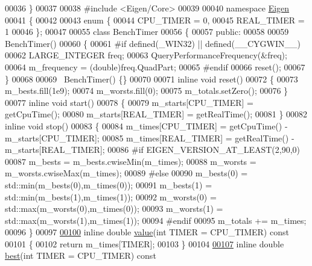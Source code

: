 \begin{DoxyCode}
00036 \}
00037 
00038 \textcolor{preprocessor}{#include <Eigen/Core>}
00039 
00040 \textcolor{keyword}{namespace }\hyperlink{namespace_eigen}{Eigen}
00041 \{
00042 
00043 \textcolor{keyword}{enum} \{
00044   CPU\_TIMER = 0,
00045   REAL\_TIMER = 1
00046 \};
00047 
00055 \textcolor{keyword}{class }BenchTimer
00056 \{
00057 \textcolor{keyword}{public}:
00058 
00059   BenchTimer()
00060   \{
00061 \textcolor{preprocessor}{#if defined(\_WIN32) || defined(\_\_CYGWIN\_\_)}
00062     LARGE\_INTEGER freq;
00063     QueryPerformanceFrequency(&freq);
00064     m\_frequency = (double)freq.QuadPart;
00065 #endif
00066     reset();
00067   \}
00068 
00069   ~BenchTimer() \{\}
00070 
00071   \textcolor{keyword}{inline} \textcolor{keywordtype}{void} reset()
00072   \{
00073     m\_bests.fill(1e9);
00074     m\_worsts.fill(0);
00075     m\_totals.setZero();
00076   \}
00077   \textcolor{keyword}{inline} \textcolor{keywordtype}{void} start()
00078   \{
00079     m\_starts[CPU\_TIMER]  = getCpuTime();
00080     m\_starts[REAL\_TIMER] = getRealTime();
00081   \}
00082   \textcolor{keyword}{inline} \textcolor{keywordtype}{void} stop()
00083   \{
00084     m\_times[CPU\_TIMER] = getCpuTime() - m\_starts[CPU\_TIMER];
00085     m\_times[REAL\_TIMER] = getRealTime() - m\_starts[REAL\_TIMER];
00086 \textcolor{preprocessor}{    #if EIGEN\_VERSION\_AT\_LEAST(2,90,0)}
00087     m\_bests = m\_bests.cwiseMin(m\_times);
00088     m\_worsts = m\_worsts.cwiseMax(m\_times);
00089 \textcolor{preprocessor}{    #else}
00090     m\_bests(0) = std::min(m\_bests(0),m\_times(0));
00091     m\_bests(1) = std::min(m\_bests(1),m\_times(1));
00092     m\_worsts(0) = std::max(m\_worsts(0),m\_times(0));
00093     m\_worsts(1) = std::max(m\_worsts(1),m\_times(1));
00094 \textcolor{preprocessor}{    #endif}
00095     m\_totals += m\_times;
00096   \}
00097 
\hyperlink{class_eigen_1_1_bench_timer_a26760f963ed8b64c126159bfea57735e}{00100}   \textcolor{keyword}{inline} \textcolor{keywordtype}{double} \hyperlink{class_eigen_1_1_bench_timer_a26760f963ed8b64c126159bfea57735e}{value}(\textcolor{keywordtype}{int} TIMER = CPU\_TIMER)\textcolor{keyword}{ const}
00101 \textcolor{keyword}{  }\{
00102     \textcolor{keywordflow}{return} m\_times[TIMER];
00103   \}
00104 
\hyperlink{class_eigen_1_1_bench_timer_ae8b673b0fa356d3432c7a65c79e8af0e}{00107}   \textcolor{keyword}{inline} \textcolor{keywordtype}{double} \hyperlink{class_eigen_1_1_bench_timer_ae8b673b0fa356d3432c7a65c79e8af0e}{best}(\textcolor{keywordtype}{int} TIMER = CPU\_TIMER)\textcolor{keyword}{ const}

\end{DoxyCode}
